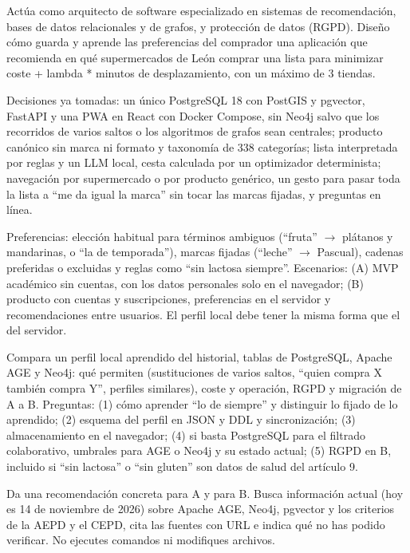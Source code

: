 \begin{tcolorbox}[colback=promptcolor, title=Prompt Introducido, colframe=blue!50!black, breakable]
	Actúa como arquitecto de software especializado en sistemas de recomendación, bases de datos relacionales y de grafos, y protección de datos (RGPD). Diseño cómo guarda y aprende las preferencias del comprador una aplicación que recomienda en qué supermercados de León comprar una lista para minimizar coste + lambda * minutos de desplazamiento, con un máximo de 3 tiendas.

	Decisiones ya tomadas: un único PostgreSQL 18 con PostGIS y pgvector, FastAPI y una PWA en React con Docker Compose, sin Neo4j salvo que los recorridos de varios saltos o los algoritmos de grafos sean centrales; producto canónico sin marca ni formato y taxonomía de 338 categorías; lista interpretada por reglas y un LLM local, cesta calculada por un optimizador determinista; navegación por supermercado o por producto genérico, un gesto para pasar toda la lista a ``me da igual la marca'' sin tocar las marcas fijadas, y preguntas en línea.

	Preferencias: elección habitual para términos ambiguos (``fruta'' $\rightarrow$ plátanos y mandarinas, o ``la de temporada''), marcas fijadas (``leche'' $\rightarrow$ Pascual), cadenas preferidas o excluidas y reglas como ``sin lactosa siempre''. Escenarios: (A) MVP académico sin cuentas, con los datos personales solo en el navegador; (B) producto con cuentas y suscripciones, preferencias en el servidor y recomendaciones entre usuarios. El perfil local debe tener la misma forma que el del servidor.

	Compara un perfil local aprendido del historial, tablas de PostgreSQL, Apache AGE y Neo4j: qué permiten (sustituciones de varios saltos, ``quien compra X también compra Y'', perfiles similares), coste y operación, RGPD y migración de A a B. Preguntas: (1) cómo aprender ``lo de siempre'' y distinguir lo fijado de lo aprendido; (2) esquema del perfil en JSON y DDL y sincronización; (3) almacenamiento en el navegador; (4) si basta PostgreSQL para el filtrado colaborativo, umbrales para AGE o Neo4j y su estado actual; (5) RGPD en B, incluido si ``sin lactosa'' o ``sin gluten'' son datos de salud del artículo 9.

	Da una recomendación concreta para A y para B. Busca información actual (hoy es 14 de noviembre de 2026) sobre Apache AGE, Neo4j, pgvector y los criterios de la AEPD y el CEPD, cita las fuentes con URL e indica qué no has podido verificar. No ejecutes comandos ni modifiques archivos.
\end{tcolorbox}


